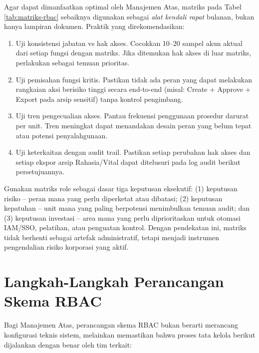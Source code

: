 \documentclass[12pt,a4paper]{report}
\begin{document}
Agar dapat dimanfaatkan optimal oleh Manajemen Atas, matriks pada Tabel \ref{tab:matriks-rbac} sebaiknya digunakan sebagai \textit{alat kendali rapat} bulanan, bukan hanya lampiran dokumen. Praktik yang direkomendasikan:
\begin{enumerate}[leftmargin=*]
  \item Uji konsistensi jabatan vs hak akses. Cocokkan 10--20 sampel akun aktual dari setiap fungsi dengan matriks. Jika ditemukan hak akses di luar matriks, perlakukan sebagai temuan prioritas.
  \item Uji pemisahan fungsi kritis. Pastikan tidak ada peran yang dapat melakukan rangkaian aksi berisiko tinggi secara end-to-end (misal: Create + Approve + Export pada arsip sensitif) tanpa kontrol pengimbang.
  \item Uji tren pengecualian akses. Pantau frekuensi penggunaan prosedur darurat per unit. Tren meningkat dapat menandakan desain peran yang belum tepat atau potensi penyalahgunaan.
  \item Uji keterkaitan dengan audit trail. Pastikan setiap perubahan hak akses dan setiap ekspor arsip Rahasia/Vital dapat ditelusuri pada log audit berikut persetujuannya.
\end{enumerate}

\begin{plnbox}
Gunakan matriks role sebagai dasar tiga keputusan eksekutif: (1) keputusan risiko -- peran mana yang perlu diperketat atau dibatasi; (2) keputusan kepatuhan -- unit mana yang paling berpotensi menimbulkan temuan audit; dan (3) keputusan investasi -- area mana yang perlu diprioritaskan untuk otomasi IAM/SSO, pelatihan, atau penguatan kontrol. Dengan pendekatan ini, matriks tidak berhenti sebagai artefak administratif, tetapi menjadi instrumen pengendalian risiko korporasi yang aktif.
\end{plnbox}


\section{Langkah-Langkah Perancangan Skema RBAC}
Bagi Manajemen Atas, perancangan skema RBAC bukan berarti merancang konfigurasi teknis sistem, melainkan memastikan bahwa proses tata kelola berikut dijalankan dengan benar oleh tim terkait:
\end{document}
